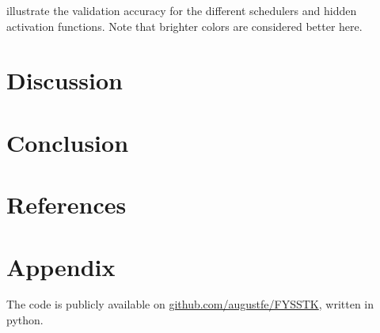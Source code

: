 \documentclass{article}
\theoremstyle{definition}
\begin{document}
 illustrate the validation accuracy for the different schedulers and hidden activation functions. Note that brighter colors are considered better here.


\newpage
\section{Discussion}

\section{Conclusion}

\section{References}

\printbibliography

\section{Appendix}
The code is publicly available on \href{https://github.com/augustfe/FYSSTK}{github.com/augustfe/FYSSTK}, written in python.
\end{document}
